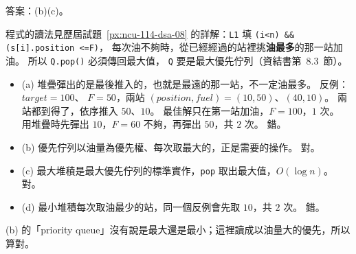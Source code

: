 \begin{pastsoln}
答案：(b)(c)。

程式的讀法見歷屆試題~\ref{px:ncu-114-dsa-08} 的詳解：\texttt{L1} 填 \texttt{(i<n) \&\& (s[i].position <=F)}，
每次油不夠時，從已經經過的站裡挑\textbf{油最多}的那一站加油。 所以 \texttt{Q.pop()} 必須傳回最大值，
\texttt{Q} 要是最大優先佇列（資結書第~8.3~節）。

\begin{itemize}
\item (a) 堆疊彈出的是最後推入的，也就是最遠的那一站，不一定油最多。 反例：$\mathit{target} = 100$、
$F = 50$，兩站 $(\mathit{position}, \mathit{fuel}) = (10, 50)$、$(40, 10)$。 兩站都到得了，依序推入
$50$、$10$。 最佳解只在第一站加油，$F = 100$，$1$ 次。 用堆疊時先彈出 $10$，$F = 60$ 不夠，再彈出
$50$，共 $2$ 次。 錯。
\item (b) 優先佇列以油量為優先權、每次取最大的，正是需要的操作。 對。
\item (c) 最大堆積是最大優先佇列的標準實作，\texttt{pop} 取出最大值，$O(\log n)$。 對。
\item (d) 最小堆積每次取油最少的站，同一個反例會先取 $10$，共 $2$ 次。 錯。
\end{itemize}
(b) 的「priority queue」沒有說是最大還是最小；這裡讀成以油量大的優先，所以算對。
\end{pastsoln}

